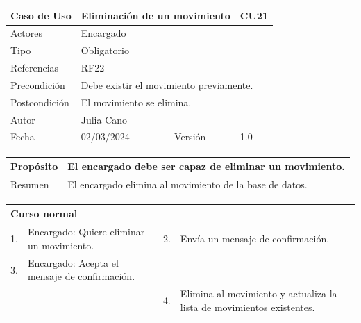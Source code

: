 \begin{table}[H]
	\centering
	\begin{tabular}{| m{} | m{} | m{} | m{}|}
		\hline
		\rowcolor{grayshade} Caso de Uso & \multicolumn{2}{|m{0.43\textwidth}|}{Eliminación de un movimiento} &  CU21\\ 
		\hline
		Actores & \multicolumn{3}{l|}{Encargado} \\ 
		\hline
		Tipo & \multicolumn{3}{l|}{Obligatorio} \\ 
		\hline
		Referencias & \multicolumn{3}{l|}{RF22} \\ 
		\hline
		Precondición & \multicolumn{3}{m{0.67\textwidth}|}{Debe existir el movimiento previamente.} \\ 
		\hline
		Postcondición & \multicolumn{3}{m{0.67\textwidth}|}{El movimiento se elimina.} \\ 
		\hline
		Autor & \multicolumn{3}{l|}{Julia Cano} \\ 
		\hline
		Fecha & 02/03/2024 & Versión & 1.0 \\
		\hline
	\end{tabular}
\end{table}

\begin{table}[H]
	\centering
	\begin{tabular}{| m{} | m{} | m{} | m{} |}
		\hline
		Propósito & \multicolumn{3}{m{0.67\textwidth}|}{El encargado debe ser capaz de eliminar un movimiento.}  \\ 
		\hline
		Resumen & \multicolumn{3}{m{0.67\textwidth}|}{El encargado elimina al movimiento de la base de datos.} \\ 
		\hline
	\end{tabular}
\end{table}


\begin{table}[H]
	\centering
	\begin{tabular}{| m{} | m{} | m{} | m{} |}
		\hline
		\multicolumn{4}{|m{0.9\textwidth}|}{Curso normal}     \\ 
		\hline
		1. & Encargado: Quiere eliminar un movimiento. & 2. &  Envía un mensaje de confirmación.  \\ 
		\hline
		3. & Encargado: Acepta el mensaje de confirmación. &   &    \\ 
		\hline
		&  & 4. & Elimina al movimiento y actualiza la lista de movimientos existentes.  \\ 
		\hline
	\end{tabular}
\end{table}


